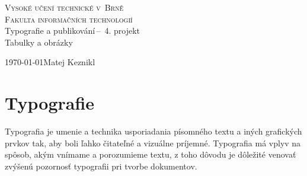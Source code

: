 \documentclass[a4paper, 11pt]{article}
\begin{document}
\begin{titlepage}
	\begin{center} 
		\textsc{\Huge Vysoké učení technické v~Brně\\
			\huge Fakulta informačních technologií \\}
			\LARGE Typografie a publikování\,--\ 4. projekt\\
			\Huge Tabulky a obrázky
			\end{center}
			\Large \today \hfill Matej Keznikl
			\end{titlepage}



\section{Typografie}
Typografia je umenie a technika usporiadania písomného textu a iných grafických prvkov tak, aby boli ľahko čitateľné a vizuálne príjemné. Typografia má vplyv na spôsob, akým vnímame a porozumieme textu, z toho dôvodu je dôležité venovať zvýšenú pozornosť typografii pri tvorbe dokumentov.
\end{document}
